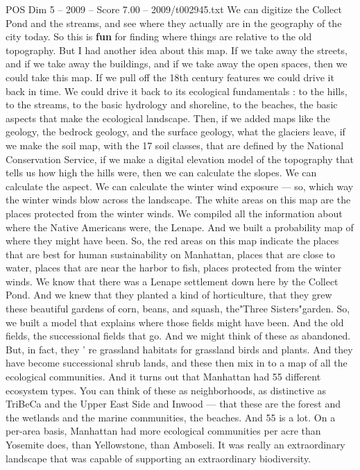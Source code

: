 \begin{textsample}{POS Dim 5 – 2009 – Score 7.00 – 2009/t002945.txt}
We can digitize the Collect Pond and the streams, and see where they actually are in the geography of the city today.
So this is \textbf{fun} for finding where things are relative to the old topography.
But I had another idea about this map.
If we take away the streets, and if we take away the buildings, and if we take away the open spaces, then we could take this map.
If we pull off the 18th century features we could drive it back in time.
We could drive it back to its ecological fundamentals : to the hills, to the streams, to the basic hydrology and shoreline, to the beaches, the basic aspects that make the ecological landscape.
Then, if we added maps like the geology, the bedrock geology, and the surface geology, what the glaciers leave, if we make the soil map, with the 17 soil classes, that are defined by the National Conservation Service, if we make a digital elevation model of the topography that tells us how high the hills were, then we can calculate the slopes.
We can calculate the aspect.
We can calculate the winter wind exposure — so, which way the winter winds blow across the landscape.
The white areas on this map are the places protected from the winter winds.
We compiled all the information about where the Native Americans were, the Lenape.
And we built a probability map of where they might have been.
So, the red areas on this map indicate the places that are best for human sustainability on Manhattan, places that are close to water, places that are near the harbor to fish, places protected from the winter winds.
We know that there was a Lenape settlement down here by the Collect Pond.
And we knew that they planted a kind of horticulture, that they grew these beautiful gardens of corn, beans, and squash, the"Three Sisters"garden.
So, we built a model that explains where those fields might have been.
And the old fields, the successional fields that go.
And we might think of these as abandoned.
But, in fact, they ' re grassland habitats for grassland birds and plants.
And they have become successional shrub lands, and these then mix in to a map of all the ecological communities.
And it turns out that Manhattan had 55 different ecosystem types.
You can think of these as neighborhoods, as distinctive as TriBeCa and the Upper East Side and Inwood — that these are the forest and the wetlands and the marine communities, the beaches.
And 55 is a lot.
On a per-area basis, Manhattan had more ecological communities per acre than Yosemite does, than Yellowstone, than Amboseli.
It was really an extraordinary landscape that was capable of supporting an extraordinary biodiversity.

\end{textsample}
